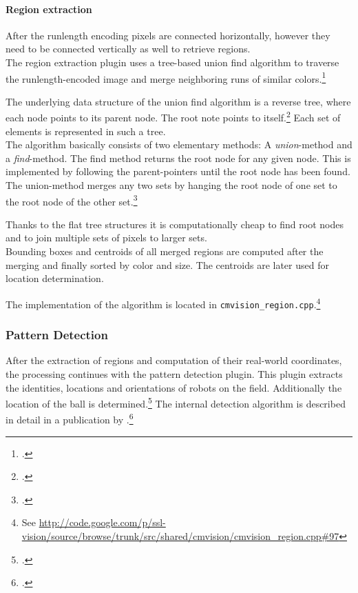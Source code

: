 \paragraph{Region extraction}
After the runlength encoding pixels are connected horizontally, however they
need to be connected vertically as well to retrieve regions.\\
The region extraction plugin uses a tree-based union find algorithm to traverse the
runlength-encoded image and merge neighboring runs of similar colors.\footcite[Cf.][p. 6 et sq.]{zickler_ssl_vision}

The underlying data structure of the union find algorithm is a reverse tree, where each node points to its parent node.
The root note points to itself.\footcite[Cf.][]{wa_union_find}
Each set of elements is represented in such a tree.\\
The algorithm basically consists of two elementary methods: A \textit{union}-method and a \textit{find}-method.
The find method returns the root node for any given node. This is implemented by following the parent-pointers
until the root node has been found. The union-method merges any two sets by hanging the root node of one set to the
root node of the other set.\footcite[Cf.][]{wa_union_find}

Thanks to the flat tree structures it is computationally cheap to find root nodes and to join multiple sets of pixels
to larger sets.\\
Bounding boxes and centroids of all merged regions are computed after the merging and finally
sorted by color and size. The centroids are later used for location determination.

The implementation of the algorithm is located in
\texttt{cmvision\_region.cpp}.\footnote{See
\url{http://code.google.com/p/ssl-vision/source/browse/trunk/src/shared/cmvision/cmvision_region.cpp\#97}}




\subsubsection{Pattern Detection}
After the extraction of regions and computation of their real-world coordinates,
the processing continues with the pattern detection plugin.
This plugin extracts the identities, locations and orientations of robots on the field.
Additionally the location of the ball is determined.\footcite[Cf.][p. 6 et sq.]{zickler_ssl_vision}
The internal detection algorithm
is described in detail in a publication by \citeauthor{bruce_2003}.\footcite[Cf.][]{bruce_2003}

